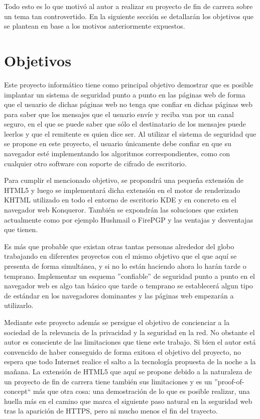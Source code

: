 Todo esto es lo que motivó al autor a realizar su proyecto de fin de carrera sobre un tema tan controvertido. En la siguiente sección se detallarán los objetivos que se plantean en base a los motivos anteriormente expuestos.

\section{Objetivos}\label{objetivos}

Este proyecto informático tiene como principal objetivo demostrar que es posible implantar un sistema de seguridad punto a punto en las páginas web de forma que el usuario de dichas páginas web no tenga que confiar en dichas páginas web para saber que los mensajes que el usuario envíe y reciba van por un canal seguro, en el que se puede saber que sólo el destinatario de los mensajes puede leerlos y que el remitente es quien dice ser. Al utilizar el sistema de seguridad que se propone en este proyecto, el usuario únicamente debe confiar en que su navegador esté implementando los algoritmos correspondientes, como con cualquier otro software con soporte de cifrado de escritorio.

Para cumplir el mencionado objetivo, se propondrá una pequeña extensión de HTML5 y luego se implementará dicha extensión en el motor de renderizado KHTML utilizado en todo el entorno de escritorio KDE y en concreto en el navegador web Konqueror. También se expondrán las soluciones que existen actualmente como por ejemplo Hushmail o FirePGP y las ventajas y desventajas que tienen.

Es más que probable que existan otras tantas personas alrededor del globo trabajando en diferentes proyectos con el mismo objetivo que el que aquí se presenta de forma simultánea, y si no lo están haciendo ahora lo harán tarde o temprano. Implementar un esquema ''confiable'' de seguridad punto a punto en el navegador web es algo tan básico que tarde o temprano se establecerá algun tipo de estándar en los navegadores dominantes y las páginas web empezarán a utilizarlo.

Mediante este proyecto además se persigue el objetivo de concienciar a la sociedad de la relevancia de la privacidad y la seguridad en la red. No obstante el autor es consciente de las limitaciones que tiene este trabajo. Si bien el autor está convencido de haber conseguido de forma exitosa el objetivo del proyecto, no espera que todo Internet realice el salto a la tecnología propuesta de la noche a la mañana. La extensión de HTML5 que aquí se propone debido a la naturaleza de un proyecto de fin de carrera tiene también sus limitaciones y es un ''proof-of-concept`` más que otra cosa: una demostración de lo que es posible realizar, una huella más en el camino que marca el siguiente paso natural en la seguridad web tras la aparición de HTTPS, pero ni mucho menos el fin del trayecto.
